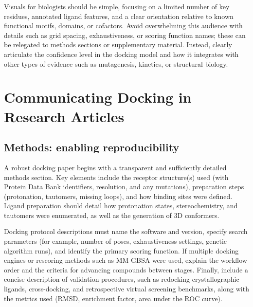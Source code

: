 \documentclass[12pt]{article}
\begin{document}
Visuals for biologists should be simple, focusing on a limited number of key residues, annotated ligand features, and a clear orientation relative to known functional motifs, domains, or cofactors.\cite{CH11_Berry2015,CH11_Forli2015,CH11_zhu2022} 
Avoid overwhelming this audience with details such as grid spacing, exhaustiveness, or scoring function names; these can be relegated to methods sections or supplementary material.\cite{CH11_Berry2015,CH11_Kitchen2004,CH11_cosconati2010} 
Instead, clearly articulate the confidence level in the docking model and how it integrates with other types of evidence such as mutagenesis, kinetics, or structural biology.\cite{CH11_Cheng2012,CH11_zhu2022,CH11_BindingAffinity2018} 

\section{Communicating Docking in Research Articles}

\subsection{Methods: enabling reproducibility}

A robust docking paper begins with a transparent and sufficiently detailed methods section.\cite{CH11_Kitchen2004,CH11_Pagadala2017,CH11_Cheng2012} 
Key elements include the receptor structure(s) used (with Protein Data Bank identifiers, resolution, and any mutations), preparation steps (protonation, tautomers, missing loops), and how binding sites were defined.\cite{CH11_Berry2015,CH11_Pagadala2017,CH11_zhu2022} 
Ligand preparation should detail how protonation states, stereochemistry, and tautomers were enumerated, as well as the generation of 3D conformers.\cite{CH11_Berry2015,CH11_Pagadala2017,CH11_Forli2015} 

Docking protocol descriptions must name the software and version, specify search parameters (for example, number of poses, exhaustiveness settings, genetic algorithm runs), and identify the primary scoring function.\cite{CH11_Pagadala2017,CH11_AutoDock4} 
If multiple docking engines or rescoring methods such as MM-GBSA were used, explain the workflow order and the criteria for advancing compounds between stages.\cite{CH11_Berry2015,CH11_EmpiricalScoring2018,CH11_cosconati2010} 
Finally, include a concise description of validation procedures, such as redocking crystallographic ligands, cross-docking, and retrospective virtual screening benchmarks, along with the metrics used (RMSD, enrichment factor, area under the ROC curve).\cite{CH11_Warren2006,CH11_Forli2015,CH11_ConsensusDocking2023} 
\end{document}
